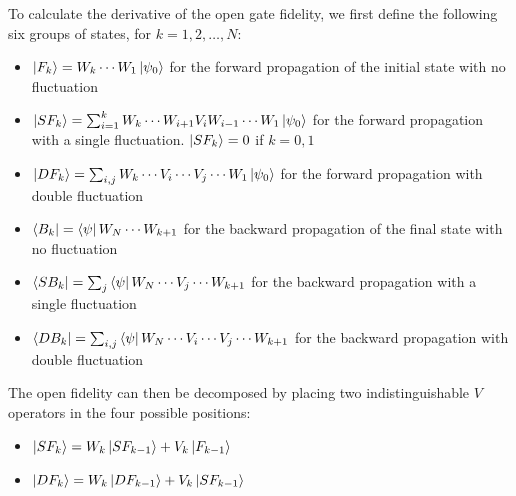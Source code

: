 \documentclass{notes2}
\begin{document}
To calculate the derivative of the open gate fidelity, we first define the following six groups of states, for $k = 1, 2,\ldots, N$:
\begin{itemize}
    \item $\ket{F_k} = W_k\cdots W_1\ket{\psi_0}$ for the forward propagation of the initial state with no fluctuation
    \item $\ket{SF_k} = \sum_{i=1}^k W_k\cdots W_{i+1}V_i W_{i-1} \cdots W_1\ket{\psi_0}$ for the forward propagation with a single fluctuation. $\ket{SF_k} = 0$ if $k = 0, 1$
    \item $\ket{DF_k} = \sum_{i,j}W_k\cdots V_i \cdots V_j \cdots W_1\ket{\psi_0}$ for the forward propagation with double fluctuation
    \item $\bra{B_k} = \bra{\psi} W_N \cdots W_{k+1}$ for the backward propagation of the final state with no fluctuation
    \item $\bra{SB_k} = \sum_{j}\bra{\psi} W_N \cdots V_j \cdots W_{k+1}$ for the backward propagation with a single fluctuation
    \item $\bra{DB_k} = \sum_{i,j}\bra{\psi} W_N \cdots V_i \cdots V_j \cdots W_{k+1}$ for the backward propagation with double fluctuation
\end{itemize}
The open fidelity can then be decomposed by placing two indistinguishable $V$ operators in the four possible positions:
\begin{itemize}
    \item $\ket{SF_k} = W_k\ket{SF_{k-1}} + V_k \ket{F_{k-1}}$
    \item $\ket{DF_k} = W_k\ket{DF_{k-1}} + V_k \ket{SF_{k-1}}$
\end{itemize}
\end{document}
